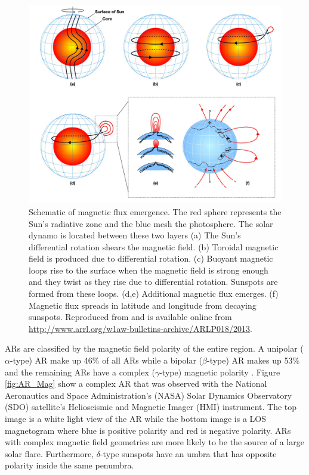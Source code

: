 	\begin{figure}
		\centering
		\includegraphics[width=\textwidth]{dynamo.pdf}
		\caption{
				 Schematic of magnetic flux emergence.
				 The red sphere represents the Sun's radiative zone and the blue mesh the photosphere.
				 The solar dynamo is located between these two layers
				 (a) The Sun's differential rotation shears the magnetic field.
				 (b) Toroidal magnetic field is produced due to differential rotation.
				 (c) Buoyant magnetic loops rise to the surface when the magnetic field is strong enough and they twist as they rise due to differential rotation.
				 Sunspots are formed from these loops.
				 (d,e) Additional magnetic flux emerges. 
				 (f) Magnetic flux spreads in latitude and longitude from decaying sunspots.
			     Reproduced from \cite{1367-2630-9-8-297} and is available online from \url{http://www.arrl.org/w1aw-bulletins-archive/ARLP018/2013}.
		        }
		\label{fig:dynamo_field}
	\end{figure}
			
	ARs are classified by the magnetic field polarity of the entire region.
	A unipolar ($\alpha$-type) AR make up 46\% of all ARs while a bipolar ($\beta$-type) AR makes up 53\% and the remaining ARs have a complex ($\gamma$-type) magnetic polarity \citep{2014masu.book.....P}.
	Figure \ref{fig:AR_Mag} show a complex AR that was observed with the National Aeronautics and Space Administration's (NASA) Solar Dynamics Observatory (SDO) satellite's Helioseismic and Magnetic Imager (HMI) instrument.
	The top image is a white light view of the AR while the bottom image is a LOS magnetogram where blue is positive polarity and red is negative polarity.
	ARs with complex magnetic field geometries are more likely to be the source of a large solar flare.
	Furthermore, $\delta$-type sunspots have an umbra that has opposite polarity inside the same penumbra.


